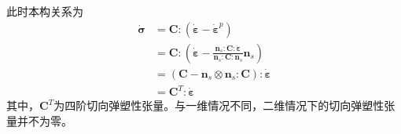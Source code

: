 此时本构关系为
\begin{equation}
    \begin{split}
        \dot{\boldsymbol \sigma} &= \boldsymbol C : (\dot{\boldsymbol \varepsilon} - \dot{\boldsymbol \varepsilon}^p) \\
                                 &= \boldsymbol C : (\dot{\boldsymbol \varepsilon} - \frac{\boldsymbol n_s : \boldsymbol C : \dot{\boldsymbol \varepsilon}}{\boldsymbol n_s : \boldsymbol C : \boldsymbol n_s} \boldsymbol n_s) \\
                                 &= (\boldsymbol C - \boldsymbol n_s \otimes \boldsymbol n_s : \boldsymbol C) : \dot{\boldsymbol \varepsilon} \\
                                 &= \boldsymbol C^T : \dot{\boldsymbol \varepsilon}
    \end{split}
\end{equation}
其中，$\boldsymbol C^T$为四阶切向弹塑性张量。与一维情况不同，二维情况下的切向弹塑性张量并不为零。
